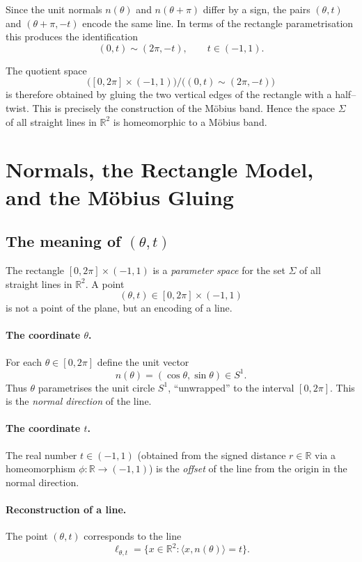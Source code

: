 \documentclass[12pt,a4paper]{article}
\theoremstyle{plain}
\theoremstyle{definition}      %
\begin{document}
	Since the unit normals $n(\theta)$ and $n(\theta+\pi)$ differ by a sign,
	the pairs $(\theta,t)$ and $(\theta+\pi,-t)$ encode the same line.
	In terms of the rectangle parametrisation this produces the identification
	\[
	(0,t)\sim(2\pi,-t), \qquad t\in(-1,1).
	\]
	
	The quotient space
	\[
	\bigl([0,2\pi]\times(-1,1)\bigr)\big/\bigl((0,t)\sim(2\pi,-t)\bigr)
	\]
	is therefore obtained by gluing the two vertical edges of the rectangle with
	a half–twist.  This is precisely the construction of the M\"obius band.
	Hence the space $\Sigma$ of all straight lines in $\mathbb{R}^2$ is
	homeomorphic to a M\"obius band.
	
	\section*{Normals, the Rectangle Model, and the M\"obius Gluing}
	
	\subsection*{The meaning of $(\theta,t)$}
	
	The rectangle $[0,2\pi]\times(-1,1)$ is a \emph{parameter space} for the set
	$\Sigma$ of all straight lines in $\mathbb{R}^2$.  
	A point
	\[
	(\theta,t)\in[0,2\pi]\times(-1,1)
	\]
	is not a point of the plane, but an encoding of a line.
	
	\paragraph{The coordinate $\theta$.}
	For each $\theta\in[0,2\pi]$ define the unit vector
	\[
	n(\theta) = (\cos\theta,\sin\theta)\in S^{1}.
	\]
	Thus $\theta$ parametrises the unit circle $S^1$,
	``unwrapped'' to the interval $[0,2\pi]$.
	This is the \emph{normal direction} of the line.
	
	\paragraph{The coordinate $t$.}
	The real number $t\in(-1,1)$ (obtained from the signed distance $r\in\mathbb{R}$
	via a homeomorphism $\phi:\mathbb{R}\to(-1,1)$) is the
	\emph{offset} of the line from the origin in the normal direction.
	
	\paragraph{Reconstruction of a line.}
	The point $(\theta,t)$ corresponds to the line
	\[
	\ell_{\theta,t}
	= \{x\in\mathbb{R}^2 : \langle x,n(\theta)\rangle = t\}.
	\]
	
\end{document}
